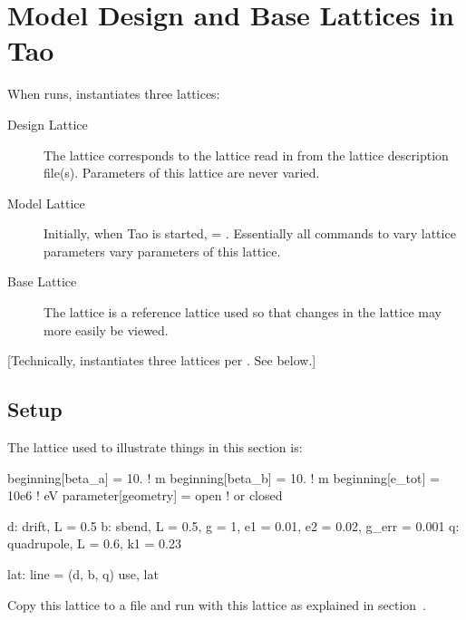 \documentclass{hitec}
\newcommand{\Section}[1]{\section{#1}\vspace*{-1ex}}
\begin{document}
\newpage

\Section{Model Design and Base Lattices in Tao}

When \tao runs, \tao instantiates three lattices:
\begin{description}
\item[Design Lattice] \Newline
The  lattice corresponds to the lattice read in from the lattice
description file(s). Parameters of this lattice are never varied.
\item[Model Lattice] \Newline
Initially, when Tao is started,  = . Essentially all commands to vary lattice
parameters vary parameters of this lattice.
\item[Base Lattice] \Newline
The  lattice is a reference lattice used so that changes in the  
lattice may more easily be viewed.
\end{description}

[Technically, \tao instantiates three lattices per . See below.]

\subsection{Setup}

The lattice used to illustrate things in this section is:
\begin{code}
beginning[beta_a] = 10.   ! m
beginning[beta_b] = 10.   ! m
beginning[e_tot] = 10e6   ! eV
parameter[geometry] = open  ! or closed

d: drift, L = 0.5
b: sbend, L = 0.5, g = 1, e1 = 0.01, e2 = 0.02, g_err = 0.001
q: quadrupole, L = 0.6, k1 = 0.23

lat: line = (d, b, q)
use, lat
\end{code}

Copy this lattice to a file and run \tao with this lattice as explained in section~.
\end{document}
